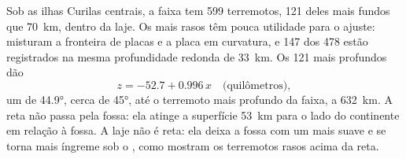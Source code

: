 Sob as ilhas Curilas centrais, a faixa tem 599 terremotos, 121 deles mais fundos que \qty{70}{km}, dentro da laje. Os mais rasos têm pouca utilidade para o ajuste: misturam a fronteira de placas e a placa em curvatura, e 147 dos 478 estão registrados na mesma profundidade redonda de \qty{33}{km}. Os 121 mais profundos dão
\[
  z = -52.7 + 0.996\,x \quad\text{(quilômetros)},
\]
um  de \ang{44.9}, cerca de \ang{45}, até o terremoto mais profundo da faixa, a \qty{632}{km}. A reta não passa pela fossa: ela atinge a superfície \qty{53}{km} para o lado do continente em relação à fossa. A laje não é reta: ela deixa a fossa com um  mais suave e se torna mais íngreme sob o , como mostram os terremotos rasos acima da reta.

